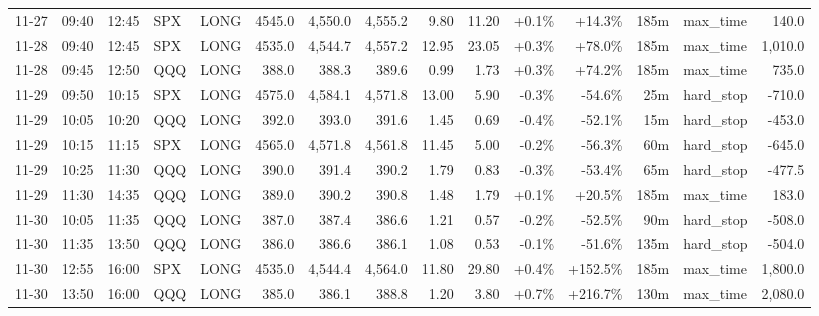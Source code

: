 \documentclass[11pt,a4paper,twoside]{article}
\begin{document}
\begin{landscape}
\begin{center}
\begin{longtable}{>{\color{txtmain}}l l l l l r r r r r r r r >{\color{txtmain}}l r}
11-27 & 09:40 & 12:45 & SPX & LONG & 4545.0 & 4,550.0 & 4,555.2 & 9.80 & 11.20 & \textcolor{wingreen}{+0.1\%} & \textcolor{wingreen}{+14.3\%} & 185m & max\_time & \textcolor{wingreen}{140.0} \\
11-28 & 09:40 & 12:45 & SPX & LONG & 4535.0 & 4,544.7 & 4,557.2 & 12.95 & 23.05 & \textcolor{wingreen}{+0.3\%} & \textcolor{wingreen}{+78.0\%} & 185m & max\_time & \textcolor{wingreen}{1,010.0} \\
11-28 & 09:45 & 12:50 & QQQ & LONG & 388.0 & 388.3 & 389.6 & 0.99 & 1.73 & \textcolor{wingreen}{+0.3\%} & \textcolor{wingreen}{+74.2\%} & 185m & max\_time & \textcolor{wingreen}{735.0} \\
11-29 & 09:50 & 10:15 & SPX & LONG & 4575.0 & 4,584.1 & 4,571.8 & 13.00 & 5.90 & \textcolor{lossred}{-0.3\%} & \textcolor{lossred}{-54.6\%} & 25m & hard\_stop & \textcolor{lossred}{-710.0} \\
11-29 & 10:05 & 10:20 & QQQ & LONG & 392.0 & 393.0 & 391.6 & 1.45 & 0.69 & \textcolor{lossred}{-0.4\%} & \textcolor{lossred}{-52.1\%} & 15m & hard\_stop & \textcolor{lossred}{-453.0} \\
11-29 & 10:15 & 11:15 & SPX & LONG & 4565.0 & 4,571.8 & 4,561.8 & 11.45 & 5.00 & \textcolor{lossred}{-0.2\%} & \textcolor{lossred}{-56.3\%} & 60m & hard\_stop & \textcolor{lossred}{-645.0} \\
11-29 & 10:25 & 11:30 & QQQ & LONG & 390.0 & 391.4 & 390.2 & 1.79 & 0.83 & \textcolor{lossred}{-0.3\%} & \textcolor{lossred}{-53.4\%} & 65m & hard\_stop & \textcolor{lossred}{-477.5} \\
11-29 & 11:30 & 14:35 & QQQ & LONG & 389.0 & 390.2 & 390.8 & 1.48 & 1.79 & \textcolor{wingreen}{+0.1\%} & \textcolor{wingreen}{+20.5\%} & 185m & max\_time & \textcolor{wingreen}{183.0} \\
11-30 & 10:05 & 11:35 & QQQ & LONG & 387.0 & 387.4 & 386.6 & 1.21 & 0.57 & \textcolor{lossred}{-0.2\%} & \textcolor{lossred}{-52.5\%} & 90m & hard\_stop & \textcolor{lossred}{-508.0} \\
11-30 & 11:35 & 13:50 & QQQ & LONG & 386.0 & 386.6 & 386.1 & 1.08 & 0.53 & \textcolor{lossred}{-0.1\%} & \textcolor{lossred}{-51.6\%} & 135m & hard\_stop & \textcolor{lossred}{-504.0} \\
11-30 & 12:55 & 16:00 & SPX & LONG & 4535.0 & 4,544.4 & 4,564.0 & 11.80 & 29.80 & \textcolor{wingreen}{+0.4\%} & \textcolor{wingreen}{+152.5\%} & 185m & max\_time & \textcolor{wingreen}{1,800.0} \\
11-30 & 13:50 & 16:00 & QQQ & LONG & 385.0 & 386.1 & 388.8 & 1.20 & 3.80 & \textcolor{wingreen}{+0.7\%} & \textcolor{wingreen}{+216.7\%} & 130m & max\_time & \textcolor{wingreen}{2,080.0} \\

\end{longtable}
\end{center}
\end{landscape}
\end{document}
